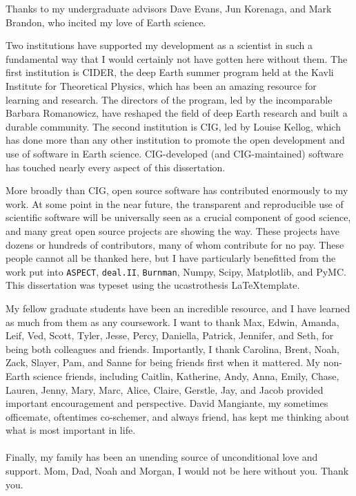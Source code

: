\documentclass[12pt]{myucthesis}
\begin{document}
\begin{frontmatter}
\begin{acknowledgements}
Thanks to my undergraduate advisors Dave Evans, Jun Korenaga, and Mark Brandon, who
incited my love of Earth science.

Two institutions have supported my development as a scientist in such a fundamental
way that I would certainly not have gotten here without them.
The first institution is CIDER, the deep Earth summer program held 
at the Kavli Institute for Theoretical Physics, 
which has been an amazing resource for learning and research.
The directors of the program, led by the incomparable Barbara Romanowicz,
have reshaped the field of deep Earth research and built a durable community.
The second institution is CIG, led by Louise Kellog, which has done more than any other institution
to promote the open development and use of software in Earth science.
CIG-developed (and CIG-maintained) software has touched nearly every aspect of this dissertation.

More broadly than CIG, open source software has contributed enormously to my work.
At some point in the near future, the transparent and reproducible use of scientific
software will be universally seen as a crucial component of good science, and many great
open source projects are showing the way. These projects have dozens or hundreds of
contributors, many of whom contribute for no pay.
These people cannot all be thanked here, but I have particularly benefitted from
the work put into \texttt{ASPECT}, \texttt{deal.II}, \texttt{Burnman},
Numpy, Scipy, Matplotlib, and PyMC.
This dissertation was typeset using the ucastrothesis \LaTeX template.

My fellow graduate students have been an incredible resource, and I
have learned as much from them as any coursework. I want to thank
Max, Edwin, Amanda, Leif, Ved, Scott, Tyler, Jesse, Percy, Daniella, Patrick, Jennifer, and Seth,
for being both colleagues and friends.
Importantly, I thank Carolina, Brent, Noah, Zack, Slayer, Pam, and Sanne for being friends first when it mattered.
My non-Earth science friends, including 
Caitlin, Katherine, Andy, Anna, Emily, Chase, Lauren, Jenny, Mary, Marc, Alice, Claire, Gerstle, Jay, and Jacob
provided important encouragement and perspective.
David Mangiante, my sometimes officemate, oftentimes co-schemer, and always friend, has kept me thinking about what is most important in life.
\\
\\
Finally, my family has been an unending source of unconditional love and support. 
Mom, Dad, Noah and Morgan, I would not be here without you. Thank you.

\end{acknowledgements}
\end{frontmatter}








\end{document}
